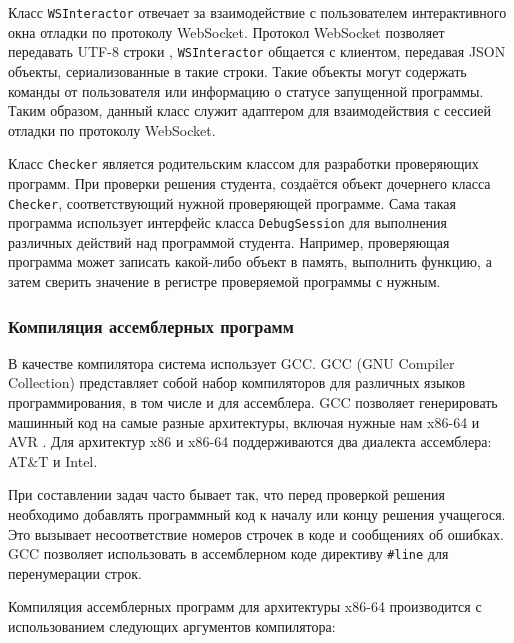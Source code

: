 \documentclass[a4paper,article,14pt]{extarticle}
\begin{document}
Класс \texttt{WSInteractor} отвечает за взаимодействие с пользователем интерактивного окна отладки по протоколу WebSocket. Протокол WebSocket позволяет передавать UTF-8 строки \cite{websocketrfc}, \texttt{WSInteractor} общается с клиентом, передавая JSON объекты, сериализованные в такие строки. Такие объекты могут содержать команды от пользователя или информацию о статусе запущенной программы. Таким образом, данный класс служит адаптером для взаимодействия с сессией отладки по протоколу WebSocket.

Класс \texttt{Checker} является родительским классом для разработки проверяющих программ. При проверки решения студента, создаётся объект дочернего класса \texttt{Checker}, соответствующий нужной проверяющей программе. Сама такая программа использует интерфейс класса \texttt{DebugSession} для выполнения различных действий над программой студента. Например, проверяющая программа может записать какой-либо объект в память, выполнить функцию, а затем сверить значение в регистре проверяемой программы с нужным.

\subsubsection{Компиляция ассемблерных программ}

В качестве компилятора система использует GCC. GCC (GNU Compiler Collection) представляет собой набор компиляторов для различных языков программирования, в том числе и для ассемблера. GCC позволяет генерировать машинный код на самые разные архитектуры, включая нужные нам x86-64 и AVR \cite{gcc}. Для архитектур x86 и x86-64 поддерживаются два диалекта ассемблера: AT\&T и Intel.

При составлении задач часто бывает так, что перед проверкой решения необходимо добавлять программный код к началу или концу решения учащегося. Это вызывает несоответствие номеров строчек в коде и сообщениях об ошибках. GCC позволяет использовать в ассемблерном коде директиву \texttt{\#line} для перенумерации строк.

Компиляция ассемблерных программ для архитектуры x86-64 производится с использованием следующих аргументов компилятора:
\end{document}
